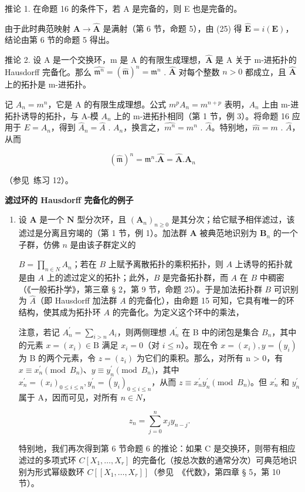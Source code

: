 推论 1. 在命题 16 的条件下，若 A 是完备的，则 E 也是完备的。

由于此时典范映射 \(\mathbf{A} \to \hat{\mathbf{A}}\) 是满射（第 6 节，命题 5），由 (25) 得 \(\hat{\mathbf{E}} = i(\mathbf{E})\)，结论由第 6 节的命题 5 得出。

推论 2. 设 A 是一个交换环，m 是 A 的有限生成理想，\(\hat{\mathbf{A}}\) 是 A 关于 m-进拓扑的 Hausdorff 完备化。那么 \(\widehat{\mathfrak{m}^n} = (\hat{\mathfrak{m}})^n = \mathfrak{m}^n\) . \(\hat{\mathbf{A}}\) 对每个整数 \(n > 0\) 都成立，且 \(\hat{\mathbf{A}}\) 上的拓扑是 m-进拓扑。

记 \(A_{n} = m^{n}\)，它是 A 的有限生成理想。公式 \(m^{p}A_{n} = m^{n+p}\) 表明，\(A_{n}\) 上由 m-进拓扑诱导的拓扑，与 A-模 \(A_{n}\) 上的 m-进拓扑相同（第 1 节，例 3）。将命题 16 应用于 \(E = A_{n}\)，得到 \(\hat{A}_{n} = \hat{A}\) . \(A_{n}\)，换言之，\(\widehat{m^{n}} = m^{n}\) . \(\hat{A}\)。特别地，\(\hat{m} = m\) . \(\hat{A}\)，从而

\[
(\hat {\mathfrak {m}}) ^ {n} = \mathfrak {m} ^ {n}. \hat {\mathbf {A}} = \hat {\mathbf {A}}. \mathbf {A} _ {n}
\]

（参见~练习 12）。

\textbf{滤过环的 Hausdorff 完备化的例子}\par

\begin{enumerate}
\def\labelenumi{(\arabic{enumi})}
\tightlist
\item
  设 \(\mathbf{A}\) 是一个 \(\mathbf{N}\) 型分次环，且 \((\mathbf{A}_n)_{n\geqslant 0}\) 是其分次；给它赋予相伴滤过，该滤过是分离且穷竭的（第 1 节，例 1）。加法群 \(\mathbf{A}\) 被典范地识别为 \(\mathbf{B}_{n}\) 的一个子群，仿佛 \(n\) 是由该子群定义的

\(B = \prod_{n \in N} A_n\)；若在 \(B\) 上赋予离散拓扑的乘积拓扑，则 \(A\) 上诱导的拓扑就是由 \(A\) 上的滤过定义的拓扑；此外，\(B\) 是完备拓扑群，而 \(A\) 在 \(B\) 中稠密（《一般拓扑学》，第三章 § 2，第 9 节，命题 25）。于是加法拓扑群 \(B\) 可识别为 \(\hat{A}\)（即 Hausdorff 加法群 \(A\) 的完备化），由命题 15 可知，它具有唯一的环结构，使其成为拓扑环 \(A\) 的完备化。为定义这个环中的乘法，

注意，若记 \(A_{n}^{\prime} = \sum_{i > n} A_{i}\)，则两侧理想 \(A_{n}^{\prime}\) 在 B 中的闭包是集合 \(B_{n}\)，其中的元素 \(x = (x_{i}) \in \mathrm{B}\) 满足 \(x_{i} = 0\)（对 \(i \leqslant n\)）。现在令 \(x = (x_{i}), y = (y_{i})\) 为 B 的两个元素，令 \(z = (z_{i})\) 为它们的乘积。那么，对所有 n \textgreater{} 0，有 \(x \equiv x_{n}^{\prime} \pmod{B_{n}}\)、\(y \equiv y_{n}^{\prime} \pmod{B_{n}}\)，其中 \(x_{n}^{\prime} = (x_{i})_{0 \leqslant i \leqslant n}, y_{n}^{\prime} = (y_{i})_{0 \leqslant i \leqslant n}\)，从而 \(z \equiv x_{n}^{\prime} y_{n}^{\prime} \pmod{B_{n}}\)。但 \(x_{n}^{\prime}\) 和 \(y_{n}^{\prime}\) 属于 A，因而可见，对所有 \(n \in N\)，

\[
z _ {n} = \sum_ {j = 0} ^ {n} x _ {j} y _ {n - j}.\tag{26}
\]

特别地，我们再次得到第 6 节命题 6 的推论：如果 C 是交换环，则带有相应滤过的多项式环 \(C[X_{1},\ldots,X_{r}]\) 的完备化（按总次数的通常分次）可典范地识别为形式幂级数环 \(C[[X_{1},\ldots,X_{r}]]\)（参见~《代数》，第四章 § 5，第 10 节）。
\end{enumerate}

